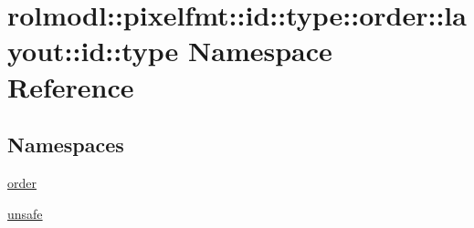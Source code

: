 \hypertarget{namespacerolmodl_1_1pixelfmt_1_1id_1_1type_1_1order_1_1layout_1_1id_1_1type}{}\section{rolmodl\+::pixelfmt\+::id\+::type\+::order\+::layout\+::id\+::type Namespace Reference}
\label{namespacerolmodl_1_1pixelfmt_1_1id_1_1type_1_1order_1_1layout_1_1id_1_1type}
\subsection*{Namespaces}
\begin{DoxyCompactItemize}
\item 
 \mbox{\hyperlink{namespacerolmodl_1_1pixelfmt_1_1id_1_1type_1_1order_1_1layout_1_1id_1_1type_1_1order}{order}}
\item 
 \mbox{\hyperlink{namespacerolmodl_1_1pixelfmt_1_1id_1_1type_1_1order_1_1layout_1_1id_1_1type_1_1unsafe}{unsafe}}
\end{DoxyCompactItemize}
